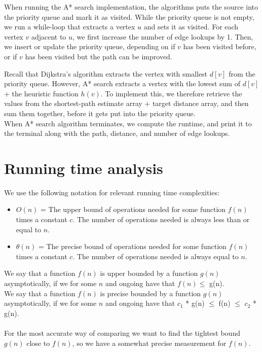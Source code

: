 \documentclass[11pt]{article}
\begin{document}
\noindent When running the A* search implementation, the algorithms puts the source into the priority queue and mark it as visited. While the priority queue is not empty, we run a while-loop that extracts a vertex $u$ and sets it as visited. For each vertex $v$ adjacent to $u$, we first increase the number of edge lookups by 1. Then, we insert or update the priority queue, depending on if $v$ has been visited before, or if $v$ has been visited but the path can be improved. 

\noindent Recall that Dijkstra's algorithm extracts the vertex with smallest $d[v]$ from the priority queue. However, A* search extracts a vertex with the lowest sum of $d[v]$ + the heuristic function $h(v)$.  To implement this, we therefore retrieve the values from the shortest-path estimate array + target distance array, and then sum them together, before it gets put into the priority queue.\\

\noindent When A* search algorithm terminates, we compute the runtime, and print it to the terminal along with the path, distance, and number of edge lookups.\\

\section{Running time analysis}
We use the following notation for relevant running time complexities:
\begin{itemize}
    \item $O(n)$ = The upper bound of operations needed for some function $f(n)$ times a constant $c$. The number of operations needed is always less than or equal to $n$.
    \item $\theta(n)$ = The precise bound of operations needed for some function $f(n)$ times a constant $c$. The number of operations needed is always equal to $n$. 
\end{itemize}
We say that a function $f(n)$ is upper bounded by a function $g(n)$ asymptotically, if we for some $n$ and ongoing have that $f(n) \leq$ g(n).\\
We say that a function $f(n)$ is precise bounded by a function $g(n)$ asymptotically, if we for some $n$ and ongoing have that $c_1$ * g(n) $\leq$ f(n) $\leq$ $c_2$ * g(n).
\\\\
For the most accurate way of comparing we want to find the tightest bound $g(n)$ close to $f(n)$, so we have a somewhat precise measurement for $f(n)$. 
\end{document}
